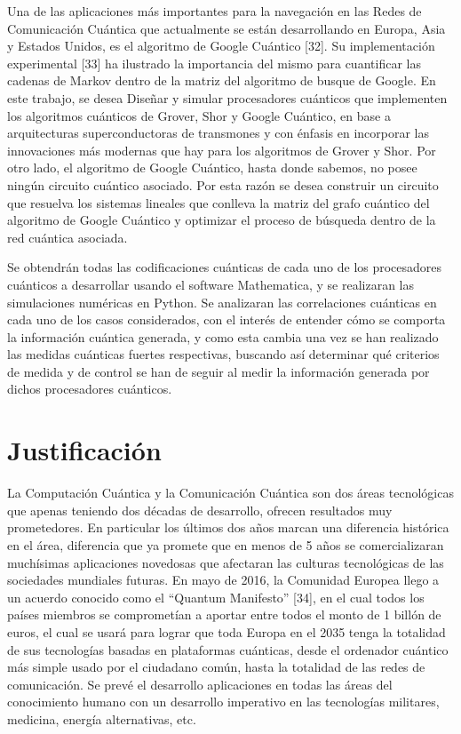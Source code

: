 Una de las aplicaciones más importantes para la navegación en las Redes de Comunicación Cuántica que actualmente se están desarrollando en Europa, Asia y Estados Unidos, es el algoritmo de Google Cuántico [32]. Su implementación experimental [33] ha ilustrado la importancia del mismo para cuantificar las cadenas de Markov dentro de la matriz del algoritmo de busque de Google. En este trabajo, se desea Diseñar y simular procesadores cuánticos que implementen los algoritmos cuánticos de Grover, Shor y Google Cuántico, en base a arquitecturas superconductoras de transmones y con énfasis en incorporar las innovaciones más modernas que hay para los algoritmos de Grover y Shor.  Por otro lado, el algoritmo de Google Cuántico, hasta donde sabemos, no posee ningún circuito cuántico asociado. Por esta razón se desea construir un circuito que resuelva los sistemas lineales que conlleva la matriz del grafo cuántico del algoritmo de Google Cuántico y optimizar el proceso de búsqueda dentro de la red cuántica asociada.

Se obtendrán todas las codificaciones cuánticas de cada uno de los procesadores cuánticos a desarrollar usando el software Mathematica, y se realizaran las simulaciones numéricas en Python. Se analizaran las correlaciones cuánticas en cada uno de los casos considerados, con el interés de entender cómo se comporta la información cuántica generada, y como esta cambia una vez se han realizado las medidas cuánticas fuertes respectivas, buscando así determinar qué criterios de medida y de control se han de seguir al medir la información generada por dichos procesadores cuánticos.

\section{Justificación}

La Computación Cuántica y la Comunicación Cuántica son dos áreas tecnológicas que apenas teniendo dos décadas de desarrollo, ofrecen resultados muy prometedores. En particular los últimos dos años marcan una diferencia histórica en el área, diferencia que ya promete que en menos de 5 años se comercializaran muchísimas aplicaciones novedosas que afectaran las culturas tecnológicas de las sociedades mundiales futuras. En mayo de 2016, la Comunidad Europea llego a un acuerdo conocido como el “Quantum Manifesto” [34], en el cual todos los países miembros se comprometían a aportar entre todos el monto de 1 billón de euros, el cual se usará para lograr que toda Europa en el 2035 tenga la totalidad de sus tecnologías basadas en plataformas cuánticas, desde el ordenador cuántico más simple usado por el ciudadano común, hasta la totalidad de las redes de comunicación. Se prevé el desarrollo aplicaciones en todas las áreas del conocimiento humano con un desarrollo imperativo en las tecnologías militares, medicina, energía alternativas, etc.

